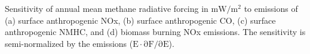 Sensitivity of annual mean methane radiative forcing in $\mathrm{mW/m^2}$ to emissions of (a) surface anthropogenic NOx, (b) surface anthropogenic CO, (c) surface anthropogenic NMHC, and (d) biomass burning NOx emissions. The sensitivity is semi-normalized by the emissions ($\mathrm{E \cdot \partial F/\partial E}$). \label{fig:rfsens}